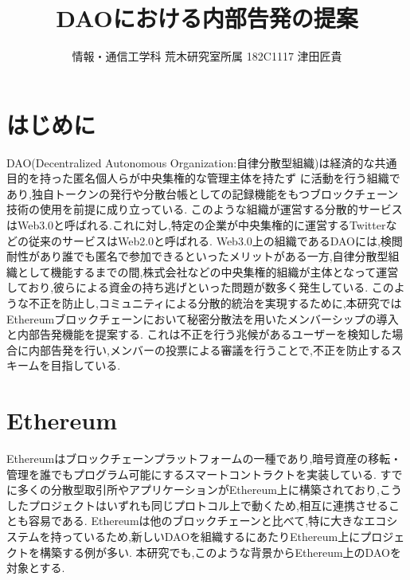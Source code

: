 \documentclass[twocolumn,10pt]{jarticle}
\title{\vspace{-1.5cm}\normalsize {\textbf {DAOにおける内部告発の提案}}}
\author{\vspace{-1.1cm} \normalsize	情報・通信工学科 荒木研究室所属 182C1117 津田匠貴}
\date{}
\begin{document}
\vspace{-10pt}
\maketitle

\vspace{-0.55cm}
\section{\normalsize はじめに}
\vspace{-0.2cm}
DAO(Decentralized Autonomous Organization:自律分散型組織)は経済的な共通目的を持った匿名個人らが中央集権的な管理主体を持たず
に活動を行う組織であり,独自トークンの発行や分散台帳としての記録機能をもつブロックチェーン技術の使用を前提に成り立っている.
このような組織が運営する分散的サービスはWeb3.0と呼ばれる.これに対し,特定の企業が中央集権的に運営するTwitterなどの従来のサービスはWeb2.0と呼ばれる.
Web3.0上の組織であるDAOには,検閲耐性があり誰でも匿名で参加できるといったメリットがある一方,自律分散型組織として機能するまでの間,株式会社などの中央集権的組織が主体となって運営しており,彼らによる資金の持ち逃げといった問題が数多く発生している.
このような不正を防止し,コミュニティによる分散的統治を実現するために,本研究ではEthereumブロックチェーンにおいて秘密分散法を用いたメンバーシップの導入と内部告発機能を提案する.
これは不正を行う兆候があるユーザーを検知した場合に内部告発を行い,メンバーの投票による審議を行うことで,不正を防止するスキームを目指している.
\vspace{-0.55cm}
\section{\normalsize Ethereum}
\vspace{-0.2cm}
Ethereumはブロックチェーンプラットフォームの一種であり,暗号資産の移転・管理を誰でもプログラム可能にするスマートコントラクトを実装している.
すでに多くの分散型取引所やアプリケーションがEthereum上に構築されており,こうしたプロジェクトはいずれも同じプロトコル上で動くため,相互に連携させることも容易である.
Ethereumは他のブロックチェーンと比べて,特に大きなエコシステムを持っているため,新しいDAOを組織するにあたりEthereum上にプロジェクトを構築する例が多い.
本研究でも,このような背景からEthereum上のDAOを対象とする.

\vspace{-0.55cm}
\end{document}

